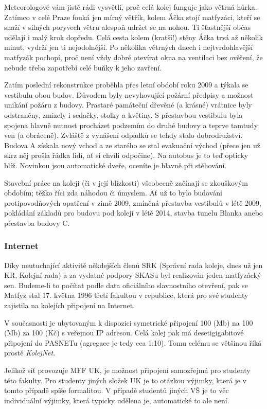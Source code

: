 Meteorologové vám jistě rádi vysvětlí, proč celá kolej funguje jako větrná
hůrka. Zatímco v celé Praze fouká jen mírný větřík, kolem Áčka stojí matfyzáci,
kteří se snaží v silných poryvech větru alespoň udržet se na nohou. Ti
šťastnější občas udělají i malý krok dopředu. Celá cesta kolem (kratší!) stěny
Áčka trvá až několik minut, vydrží jen ti nejodolnější. Po několika větrných
dnech i nejtvrdohlavější matfyzák pochopí, proč není vždy dobré otevírat okna na
ventilaci bez ověření, že nebude třeba zapotřebí celé buňky k jeho zavření.

Zatím poslední rekonstrukce proběhla přes letní období roku 2009 a týkala se
vestibulu obou budov. Důvodem byly nevyhovující požární předpisy a možnost
unikání požáru z budovy. Prastaré památeční dřevěné (a krásné) vrátnice byly
odstraněny, zmizely i sedačky, stolky a květiny. S přestavbou vestibulu byla
spojena hlavně nutnost procházet podzemím do druhé budovy a teprve tamtudy ven
(a obráceně). Zvláště z vynášení odpadků se tehdy stalo dobrodružství. Budova A
získala nový vchod a ze starého se stal evakuační východ (přece jen už skrz něj
prošla řádka lidí, ať si chvíli odpočine). Na autobus je to teď opticky blíž.
Novinkou jsou automatické dveře, oceníte je hlavně při stěhování.

Stavební práce na koleji (či v její blízkosti) všeobecně začínají se zkouškovým
obdobím; těžko říci zda náhodou či úmyslem. Ať už to bylo budování
protipovodňových opatření v zimě 2009, zmíněná přestavba vestibulů v létě 2009,
pokládání základů pro budovu pod kolejí v létě 2014, stavba tunelu Blanka anebo
přestavba budovy C.


\subsubsection{Internet}
Díky neutuchající aktivitě někdejších členů SRK (Správní rada koleje, dnes už
jen KR, Kolejní rada) a za vydatné podpory SKASu byl realizován jeden matfyzácký
sen. Budeme-li to počítat podle data oficiálního slavnostního otevření, pak se
Matfyz stal 17. května 1996 třetí fakultou v republice, která pro své studenty
zajistila na kolejích připojení na Internet.

V současnosti je ubytovaným k dispozici symetrické připojení 100 (Mb) na 100
(Mb) za 100 (Kč) s veřejnou IP adresou. Celá kolej pak má desetigigabitové
připojení do PASNETu (agregace je tedy cca 1:10). Tomu celému se většinou říká
prostě \textit{KolejNet}.

Jelikož síť provozuje MFF UK, je možnost připojení samozřejmá pro studenty této
fakulty. Pro studenty jiných složek UK je to otázkou výjimky, která je v tomto
případě spíše formalitou. V případě studentů jiných VŠ je to věc individuální
výjimky, která typicky udělena je, automatické to ale není.


